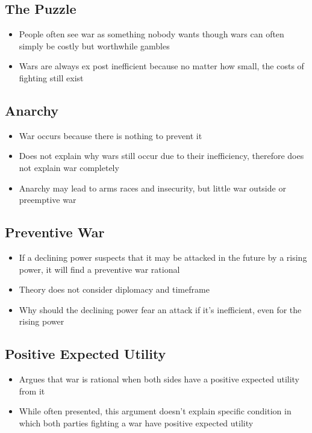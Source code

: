 \documentclass[11pt]{article}
\begin{document}
\subsection{The Puzzle}
\label{sec:org9238659}
\begin{itemize}
\item People often see war as something nobody wants though wars can often simply be costly but worthwhile gambles
\item Wars are always ex post inefficient because no matter how small, the costs of fighting still exist
\end{itemize}
\subsection{Anarchy}
\label{sec:orgde76b61}
\begin{itemize}
\item War occurs because there is nothing to prevent it
\item Does not explain why wars still occur due to their inefficiency, therefore does not explain war completely
\item Anarchy may lead to arms races and insecurity, but little war outside or preemptive war
\end{itemize}
\subsection{Preventive War}
\label{sec:orgdaf4177}
\begin{itemize}
\item If a declining power suspects that it may be attacked in the future by a rising power, it will find a preventive war rational
\item Theory does not consider diplomacy and timeframe
\item Why should the declining power fear an attack if it's inefficient, even for the rising power
\end{itemize}
\subsection{Positive Expected Utility}
\label{sec:org30f4974}
\begin{itemize}
\item Argues that war is rational when both sides have a positive expected utility from it
\item While often presented, this argument doesn't explain specific condition in which both parties fighting a war have positive expected utility
\end{itemize}
\end{document}

